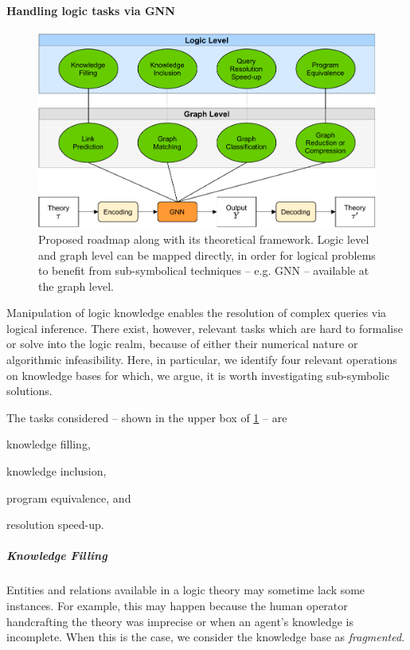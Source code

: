 \documentclass[12pt,a4paper,openright,twoside]{book}
\begin{document}
\paragraph{Handling logic tasks via GNN}

\begin{figure}
    \centering
    \includegraphics[width=.7\linewidth]{figures/workflow.pdf}
    \caption{Proposed roadmap along with its theoretical framework.
        Logic level and graph level can be mapped directly, in order for logical problems to benefit from sub-symbolical techniques -- e.g. GNN -- available at the graph level.}
    \label{fig:workflow}
\end{figure}

Manipulation of logic knowledge enables the resolution of complex queries via logical inference.
%
There exist, however, relevant tasks which are hard to formalise or solve into the logic realm, because of either their numerical nature or algorithmic infeasibility.
%
Here, in particular, we identify four relevant operations on knowledge bases for which, we argue, it is worth investigating sub-symbolic solutions.

The tasks considered -- shown in the upper box of \cref{fig:workflow} -- are
%
\begin{inlinelist}
    \item knowledge filling,
    \item knowledge inclusion,
    \item program equivalence, and
    \item resolution speed-up.
\end{inlinelist}

\subparagraph{Knowledge Filling}

Entities and relations available in a logic theory may sometime lack some instances.
%
For example, this may happen because the human operator handcrafting the theory was imprecise or when an agent's knowledge is incomplete.
%
When this is the case, we consider the knowledge base as \emph{fragmented}.
\end{document}
